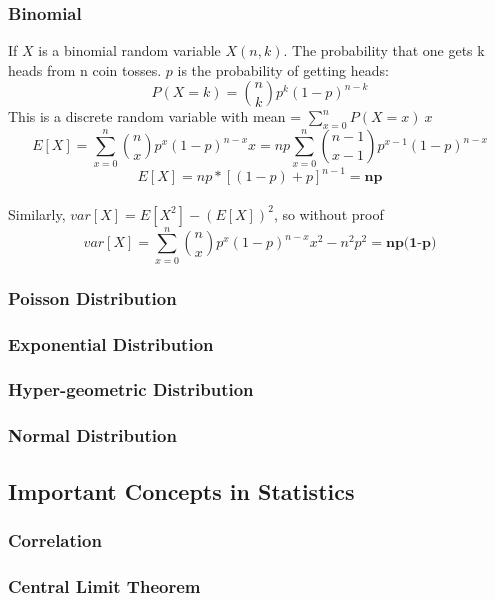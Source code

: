 \documentclass[12pt]{article}
\begin{document}
\subsubsection{Binomial}
If $X$ is a binomial random variable $X(n,k)$. The probability that one gets k heads from n coin tosses. $p$ is the probability of getting heads: 
\begin{equation*}
P(X = k) = \binom{n}{k} p^{k}(1-p)^{n-k}
\end{equation*}
This is a discrete random variable with mean = $\sum\limits_{x =0}^{n} P(X = x)\:x\: $
\begin{equation*}
    E[X] = \sum\limits_{x = 0}^{n} \binom{n}{x} p^{x}(1-p)^{n-x} x = np\sum\limits_{x = 0}^{n} \binom{n-1}{x-1} p^{x-1}(1-p)^{n-x} 
\end{equation*}
\begin{equation*}
    E[X] = np*[(1-p) + p]^{n-1} = \textbf{np}
\end{equation*}\\
Similarly, $var[X] = E[X^{2}] - (E[X])^{2}$, so without proof
\begin{equation*}
    var[X] = \sum\limits_{x = 0}^{n} \binom{n}{x} p^{x}(1-p)^{n-x} x^{2} - n^{2}p^{2} = \textbf{np(1-p)} 
\end{equation*}
\subsubsection{Poisson Distribution}
\subsubsection{Exponential Distribution}
\subsubsection{Hyper-geometric Distribution}
\subsubsection{Normal Distribution}

\subsection{Important Concepts in Statistics}
\subsubsection{Correlation}
\subsubsection{Central Limit Theorem}
\end{document}
